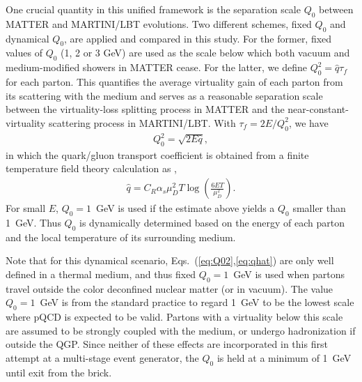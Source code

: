 \documentclass[aps,prc,twocolumn,floatfix,superscriptaddress,nofootinbib]{revtex4}
\begin{document}
One crucial quantity in this unified framework is the separation scale $Q_0$ between MATTER and MARTINI/LBT evolutions. Two different schemes, fixed $Q_0$ and dynamical $Q_0$, are applied and compared in this study. For the former, fixed values of $Q_0$ (1, 2 or 3 GeV) are used as the scale below which both vacuum and medium-modified showers in MATTER cease. For the latter, we define $Q_0^2=\hat{q}\tau_f$ for each parton. This quantifies the average virtuality gain of each parton from its scattering with the medium and serves as a reasonable separation scale between the virtuality-loss splitting process in MATTER and the near-constant-virtuality scattering process in MARTINI/LBT. With $\tau_f=2E/Q_0^2$, we have
\begin{eqnarray}
\label{eq:Q02}
Q_0^2=\sqrt{2E\hat{q}},
\end{eqnarray}
in which the quark/gluon transport coefficient is obtained from a finite temperature field theory calculation as \cite{Gyulassy:1993hr,CaronHuot:2010bp}, 
\begin{eqnarray}
\label{eq:qhat}
\hat{q}=C_R\alpha_s\mu_D^2 T \log\left(\frac{6ET}{\mu_D^2}\right).
\end{eqnarray}
For small $E$, $Q_0=1$~GeV is used if the estimate above yields a $Q_0$ smaller than 1~GeV.
Thus $Q_0$ is dynamically determined based on the energy of each parton and the local temperature of its surrounding medium. 

Note that for this dynamical scenario, Eqs.~(\ref{eq:Q02},\ref{eq:qhat}) are only well defined in a thermal medium, and thus fixed $Q_0=1$~GeV is used when partons travel outside the color deconfined nuclear matter (or in vacuum). The value $Q_0=1$~GeV is from the standard practice to regard 1~GeV to be the lowest scale where pQCD is expected to be valid. Partons with a virtuality below this scale are assumed to be strongly coupled with the medium, or undergo hadronization if outside the QGP. Since neither of these effects are incorporated in this first attempt at a multi-stage event generator, the $Q_0$ is held at a minimum of 1~GeV until exit from the brick. 
 
\end{document}
